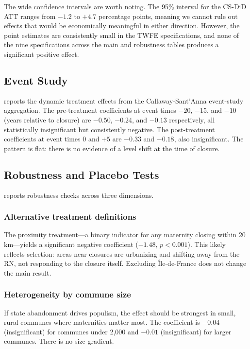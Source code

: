 \documentclass[12pt]{article}
\begin{document}
The wide confidence intervals are worth noting. The 95\% interval for the CS-DiD ATT ranges from $-1.2$ to $+4.7$ percentage points, meaning we cannot rule out effects that would be economically meaningful in either direction. However, the point estimates are consistently small in the TWFE specifications, and none of the nine specifications across the main and robustness tables produces a significant positive effect.



\subsection{Event Study}

 reports the dynamic treatment effects from the Callaway-Sant'Anna event-study aggregation. The pre-treatment coefficients at event times $-20$, $-15$, and $-10$ (years relative to closure) are $-0.50$, $-0.24$, and $-0.13$ respectively, all statistically insignificant but consistently negative. The post-treatment coefficients at event times 0 and $+5$ are $-0.33$ and $-0.18$, also insignificant. The pattern is flat: there is no evidence of a level shift at the time of closure.



\subsection{Robustness and Placebo Tests}

 reports robustness checks across three dimensions.

\subsubsection*{Alternative treatment definitions} The proximity treatment---a binary indicator for any maternity closing within 20 km---yields a significant negative coefficient ($-1.48$, $p < 0.001$). This likely reflects selection: areas near closures are urbanizing and shifting away from the RN, not responding to the closure itself. Excluding \^{I}le-de-France does not change the main result.

\subsubsection*{Heterogeneity by commune size} If state abandonment drives populism, the effect should be strongest in small, rural communes where maternities matter most. The coefficient is $-0.04$ (insignificant) for communes under 2,000 and $-0.01$ (insignificant) for larger communes. There is no size gradient.
\end{document}
